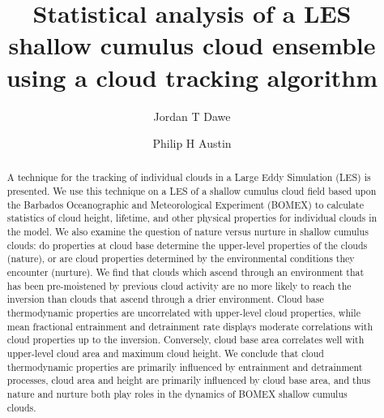 \documentclass[acp]{copernicus}
\begin{document}
\title{Statistical analysis of a LES shallow cumulus cloud ensemble using a 
cloud tracking algorithm}


\author[1]{Jordan T Dawe}
\author[1]{Philip H Austin}










\received{}
\pubdiscuss{} %
\revised{}
\accepted{}
\published{}




\maketitle



\begin{abstract}
A technique for the tracking of individual clouds in a Large Eddy Simulation 
(LES) is presented.  We use this technique on a LES of a shallow cumulus cloud 
field based upon the Barbados Oceanographic and Meteorological Experiment 
(BOMEX) to calculate statistics of cloud height, lifetime, and other physical 
properties for individual clouds in the model.  We also examine the question of 
nature versus nurture in shallow cumulus clouds: do properties at cloud base 
determine the upper-level properties of the clouds (nature), or are cloud 
properties determined by the environmental conditions they encounter (nurture). 
We find that clouds which ascend through an environment that has been 
pre-moistened by previous cloud activity are no more likely to reach the 
inversion than clouds that ascend through a drier environment.  Cloud base 
thermodynamic properties are uncorrelated with upper-level cloud properties, 
while mean fractional entrainment and detrainment rate displays moderate 
correlations with cloud properties up to the inversion.  Conversely, cloud base 
area correlates well with upper-level cloud area and maximum cloud height.  We 
conclude that cloud thermodynamic properties are primarily influenced by 
entrainment and detrainment processes, cloud area and height are primarily 
influenced by cloud base area, and thus nature and nurture both play roles in 
the dynamics of BOMEX shallow cumulus clouds.
\end{abstract}
\end{document}
